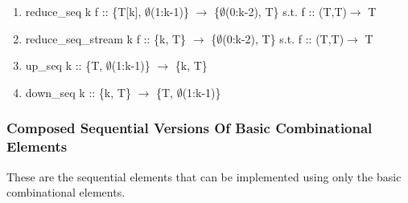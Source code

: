 \documentclass[11pt,fleqn]{article}
\numberwithin{equation}{subsection}
\begin{document}
\begin{enumerate}
    \item reduce\_seq k f :: \{T[k], $\emptyset$(1:k-1)\} $\rightarrow$ \{$\emptyset$(0:k-2), T\}
        \subitem s.t. f :: (T,T)$\rightarrow$ T
    \item reduce\_seq\_stream k f :: \{k, T\} $\rightarrow$ \{$\emptyset$(0:k-2), T\}
        \subitem s.t. f :: (T,T)$\rightarrow$ T
    \item up\_seq k :: \{T, $\emptyset$(1:k-1)\} $\rightarrow$ \{k, T\}
    \item down\_seq k :: \{k, T\} $\rightarrow$ \{T, $\emptyset$(1:k-1)\}
\end{enumerate}

\subsubsection{Composed Sequential Versions Of Basic Combinational Elements}
These are the sequential elements that can be implemented using only the basic
combinational elements.
\end{document}
